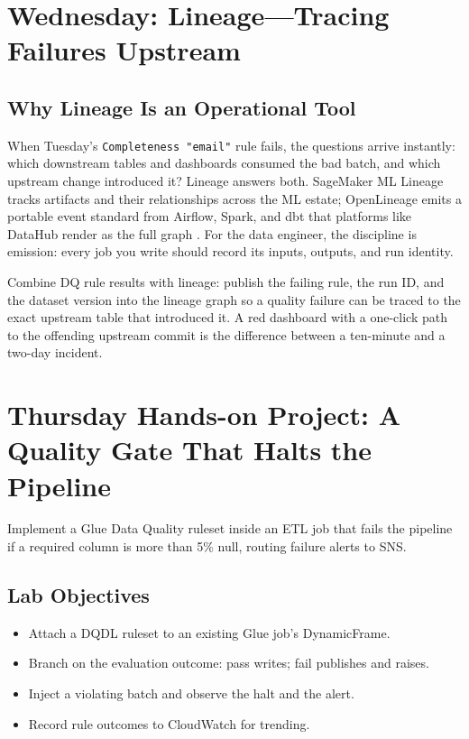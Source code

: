 \section{Wednesday: Lineage---Tracing Failures Upstream}
\subsection{Why Lineage Is an Operational Tool}
When Tuesday's \texttt{Completeness "email"} rule fails, the questions arrive instantly: which downstream tables and dashboards consumed the bad batch, and which upstream change introduced it? Lineage answers both. SageMaker ML Lineage tracks artifacts and their relationships across the ML estate; OpenLineage emits a portable event standard from Airflow, Spark, and dbt that platforms like DataHub render as the full graph \cite{openLineage,dataHubProject}. For the data engineer, the discipline is emission: every job you write should record its inputs, outputs, and run identity.

\begin{tipbox}
Combine DQ rule results with lineage: publish the failing rule, the run ID, and the dataset version into the lineage graph so a quality failure can be traced to the exact upstream table that introduced it. A red dashboard with a one-click path to the offending upstream commit is the difference between a ten-minute and a two-day incident.
\end{tipbox}

\section{Thursday Hands-on Project: A Quality Gate That Halts the Pipeline}
Implement a Glue Data Quality ruleset inside an ETL job that fails the pipeline if a required column is more than 5\% null, routing failure alerts to SNS.

\subsection*{Lab Objectives}
\begin{itemize}
    \item Attach a DQDL ruleset to an existing Glue job's DynamicFrame.
    \item Branch on the evaluation outcome: pass writes; fail publishes and raises.
    \item Inject a violating batch and observe the halt and the alert.
    \item Record rule outcomes to CloudWatch for trending.
\end{itemize}

